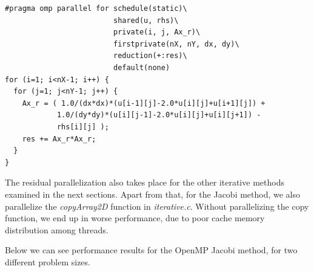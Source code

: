 \documentclass[11pt]{report}
\begin{document}
\begin{lstlisting}
#pragma omp parallel for schedule(static)\
                         shared(u, rhs)\ 
                         private(i, j, Ax_r)\
                         firstprivate(nX, nY, dx, dy)\
                         reduction(+:res)\
                         default(none)
for (i=1; i<nX-1; i++) {
  for (j=1; j<nY-1; j++) {    
    Ax_r = ( 1.0/(dx*dx)*(u[i-1][j]-2.0*u[i][j]+u[i+1][j]) +
            1.0/(dy*dy)*(u[i][j-1]-2.0*u[i][j]+u[i][j+1]) -
            rhs[i][j] );
    res += Ax_r*Ax_r;
  }
}
\end{lstlisting}

The residual parallelization also takes place for the other iterative methods examined in the next sections. Apart from that, for the Jacobi method, we also parallelize the \emph{copyArray2D} function in \emph{iterative.c}. Without parallelizing the copy function, we end up in worse performance, due to poor cache memory distribution among threads.
\newline

Below we can see performance results for the OpenMP Jacobi method, for two different problem sizes.
\end{document}
